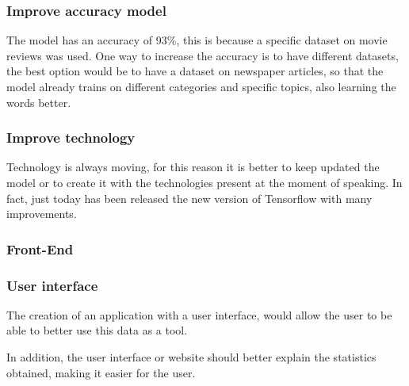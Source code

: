\subsubsection*{Improve accuracy model}
The model has an \gls{accuracy} of 93\%, this is because a specific dataset on movie reviews was used.
One way to increase the \gls{accuracy} is to have different datasets, the best option would be to have a dataset on newspaper articles, so that the model already trains on different categories and specific topics, also learning the words better.

\subsubsection*{Improve technology}
Technology is always moving, for this reason it is better to keep updated the model or to create it with the technologies present at the moment of speaking.
In fact, just today has been released the new version of \gls{Tensorflow} with many improvements.


\subsubsection{Front-End}
\subsubsection*{User interface}
The creation of an application with a user interface, would allow the user to be able to better use this data as a tool.

In addition, the user interface or website should better explain the statistics obtained, making it easier for the user.
